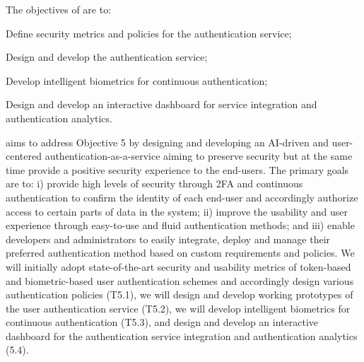 \addtocounter{wpno}{1}
\begin{Workpackage}{\thewpno}
\WPTitle{\wpname{\thewpno}}

\begin{WPObjectives}
The objectives of \theWP{} are to:
\begin{compactitem}
\item Define security metrics and policies for the authentication service;
\item Design and develop the authentication service;
\item Develop intelligent biometrics for continuous authentication;
\item Design and develop an interactive dashboard for service integration and authentication analytics.
\end{compactitem}
\end{WPObjectives}

\begin{WPDescription}
\theWP{} aims to address Objective 5 by designing and developing an AI-driven and user-centered authentication-as-a-service aiming to preserve security but at the same time provide a positive security experience to the end-users. The primary goals are to: i) provide high levels of security through 2FA and continuous authentication to confirm the identity of each end-user and accordingly authorize access to certain parts of data in the system; ii) improve the usability and user experience through easy-to-use and fluid authentication methods; and iii) enable developers and administrators to easily integrate, deploy and manage their preferred authentication method based on custom requirements and policies. We will initially adopt state-of-the-art security and usability metrics of token-based and biometric-based user authentication schemes and accordingly design various authentication policies (T5.1), we will design and develop working prototypes of the user authentication service (T5.2), we will develop intelligent biometrics for continuous authentication (T5.3), and design and develop an interactive dashboard for the authentication service integration and authentication analytics (5.4).

\end{WPDescription}

\begin{Task}


\end{Task}
\end{Workpackage}

